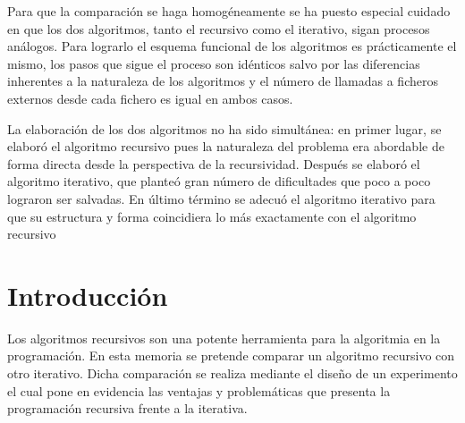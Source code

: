 \documentclass[12pt,a4paper]{article}
\begin{document}
Para que la comparación se haga homogéneamente se ha puesto especial cuidado en que los dos algoritmos, tanto el recursivo como el iterativo, sigan procesos análogos. Para lograrlo el esquema funcional de los algoritmos es prácticamente el mismo, los pasos que sigue el proceso son idénticos salvo por las diferencias inherentes a la naturaleza de los algoritmos y el número de llamadas a ficheros externos desde cada fichero es igual en ambos casos. 

La elaboración de los dos algoritmos no ha sido simultánea: en primer lugar, se elaboró el algoritmo recursivo pues la naturaleza del problema era abordable de forma directa desde la perspectiva de la recursividad. Después se elaboró el algoritmo iterativo, que planteó gran número de dificultades que poco a poco lograron ser salvadas. En último término se adecuó el algoritmo iterativo para que su estructura y forma coincidiera lo más exactamente con el algoritmo recursivo
{
 \hypersetup{linkcolor=black}%
 
 \tableofcontents
}

\clearpage



\section*{Introducción}
Los algoritmos recursivos son una potente herramienta para la algoritmia en la programación. En esta memoria se pretende comparar un algoritmo recursivo con otro iterativo. Dicha comparación se realiza mediante el diseño de un experimento el cual pone en evidencia las ventajas y problemáticas que presenta la programación recursiva frente a la iterativa.

\vspace{0.3cm}
\end{document}
